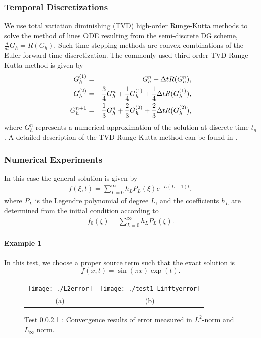 \documentclass[final,leqno]{siamltex704}
\begin{document}
\subsubsection{Temporal Discretizations}
We use total variation diminishing (TVD) high-order Runge-Kutta methods to solve the method of lines ODE resulting from the semi-discrete DG scheme, $\frac{d}{dt}G_h=R(G_h)$. Such time stepping methods are convex combinations of the Euler forward time discretization. The commonly used third-order TVD Runge-Kutta method is given by
\begin{eqnarray}
G_h^{(1)}&=&G_h^n+\Delta tR(G_h^n),\notag\\
G_h^{(2)}&=&\frac{3}{4}G_h^n+\frac{1}{4}G_h^{(1)}+\frac{1}{4}\Delta tR(G_h^{(1)}),\notag\\
G_h^{n+1}&=&\frac{1}{3}G_h^n+\frac{2}{3}G_h^{(2)}+\frac{2}{3}\Delta tR(G_h^{(2)}),
\end{eqnarray}
where $G_h^n$ represents a numerical approximation of the solution at discrete time $t_n$. A detailed description of the TVD Runge-Kutta method can be found in \cite{ShuOsher1988}.

\subsubsection{Numerical Experiments}
In this case the general solution is given by
\begin{eqnarray}
f(\xi,t)=\sum_{L=0}^{\infty}h_LP_L(\xi)e^{-L(L+1)t},
\end{eqnarray}
where $P_L$ is the Legendre polynomial of degree $L$, and the coefficients $h_L$ are determined from the initial condition according to
\begin{eqnarray*}
f_0(\xi)=\sum_{L=0}^{\infty}h_LP_L(\xi).
\end{eqnarray*}

\paragraph{Example 1}\label{Sect2-Ex1} 
In this test, we choose a proper source term such that the exact solution is 
$$f(x,t)=\sin(\pi x)\exp(t).$$

\begin{figure}[h!]
\centering
\begin{tabular}{cc}
  \texttt{[image: ./L2error]}&
   \texttt{[image: ./test1-Linftyerror]} \\
  \footnotesize (a) & \footnotesize(b) 
\end{tabular}
\caption{Test \ref{Sect2-Ex1} : Convergence results of error measured in $L^2$-norm and $L_{\infty}$ norm.}
\end{figure}
\end{document}
